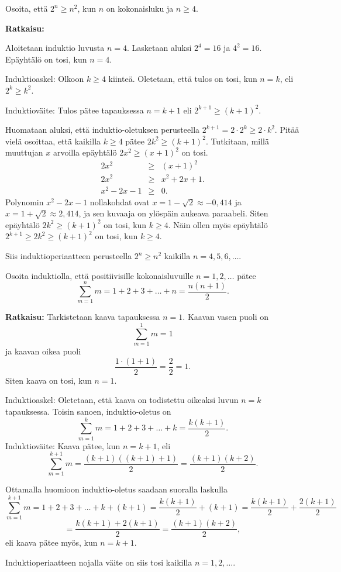 \begin{esimerkki}
Osoita, että $2^n \ge n^2$, kun $n$ on kokonaisluku ja $n \ge 4$.

{\bf Ratkaisu:}

Aloitetaan induktio luvusta $n=4$. Lasketaan aluksi $2^4 = 16$ ja $4^2 = 16$. Epäyhtälö on tosi, kun $n=4$.

Induktioaskel: Olkoon $k\ge 4$ kiinteä. Oletetaan, että tulos on tosi, kun $n=k$, eli $2^k \ge k^2$.

Induktioväite: Tulos pätee tapauksessa $n=k+1$ eli $2^{k+1} \ge (k+1)^2$.

Huomataan aluksi, että induktio-oletuksen perusteella $2^{k+1} = 2 \cdot 2^k \ge 2 \cdot k^2$. Pitää vielä osoittaa, että kaikilla $k \ge 4$ pätee $2k^2 \ge (k + 1)^2$.
Tutkitaan, millä muuttujan $x$ arvoilla epäyhtälö $2x^2 \ge (x + 1)^2$ on tosi.
\begin{eqnarray*}
 2x^2 &\ge& (x + 1)^2\\
 2x^2 &\ge& x^2 + 2x + 1.\\ 
x^2 - 2x - 1 &\ge& 0.
\end{eqnarray*}
Polynomin $x^2 - 2x - 1$ nollakohdat ovat $x = 1 - \sqrt{2}\approx -0,414$ ja $x = 1 + \sqrt{2}\approx 2,414$, ja sen kuvaaja on ylöspäin aukeava paraabeli. Siten epäyhtälö $2k^2 \ge (k + 1)^2$ on tosi, kun $k \ge 4$. Näin ollen myös epäyhtälö $2^{k+1} \ge 2k^2 \ge (k + 1)^2$ on tosi, kun $k \ge 4$. 

Siis induktioperiaatteen perusteella $2^n \ge n^2$ kaikilla $n=4,5,6,\ldots$.
\end{esimerkki}


\begin{esimerkki}
Osoita induktiolla, että
positiivisille kokonaisluvuille $n=1,2,\ldots$ pätee
\[
\sum_{m=1}^n m = 1+2+3+\ldots+n= \frac{n(n+1)}{2}.
\]

{\bf Ratkaisu:} Tarkistetaan kaava tapauksessa $n=1$.
Kaavan vasen puoli on
\[
\sum_{m=1}^1 m = 1
\]
ja kaavan oikea puoli
\[
\frac{1\cdot (1+1)}{2}= \frac{2}{2}=1.
\]
Siten kaava on tosi, kun $n=1$.

Induktioaskel: Oletetaan, että kaava on todistettu
oikeaksi luvun $n=k$ tapauksessa. Toisin sanoen,
induktio-oletus on
\[
\sum_{m=1}^k m = 1+2+3+ \ldots + k = \frac{k(k+1)}{2}.
\]
Induktioväite: Kaava pätee, kun $n=k+1$, eli
\[
\sum_{m=1}^{k+1} m = \frac{(k+1)((k+1)+1)}{2} =
\frac{(k+1)(k+2)}{2}.
\]

Ottamalla huomioon induktio-oletus saadaan suoralla
laskulla
\[
\sum_{m=1}^{k+1} m = 1+2+3+ \ldots + k + (k + 1)
= \frac{k(k+1)}{2} + (k+1) = \frac{k(k+1)}{2} +
\frac{2(k+1)}{2}
\]
\[
=\frac{k(k+1) + 2(k+1)}{2} = \frac{(k+1)(k+2)}{2},
\]
eli kaava pätee myös, kun $n=k+1$.

Induktioperiaatteen nojalla väite on siis tosi kaikilla
$n=1,2,\ldots$.
\end{esimerkki}

